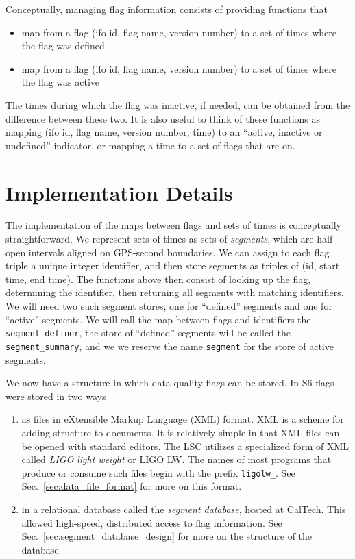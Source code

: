Conceptually, managing flag information consists of providing
functions that
%
\begin{itemize}
\item map from a flag (ifo id, flag name, version number) to a set of
times where the flag was defined
\item map from a flag (ifo id, flag name, version number) to a set of
times where the flag was active
\end{itemize}
%
The times
during which the flag was inactive, if needed, can be obtained from the
difference between these two.  It is also useful to think of these
functions as mapping (ifo id, flag name, version number, time) to an
``active, inactive or undefined'' indicator, or mapping a time to a
set of flags that are on.






\section{Implementation Details}

The implementation of the maps between flags and sets of times is
conceptually straightforward.  We represent sets of times as sets of
\emph{segments}, which are half-open intervals aligned on GPS-second
boundaries.  We can assign to each flag triple a unique integer
identifier, and then store segments as triples of (id, start time, end
time).  The functions above then consist of looking up the flag,
determining the identifier, then returning all segments with matching
identifiers.  We will need two such segment stores, one for
``defined'' segments and one for ``active'' segments.  We will call
the map between flags and identifiers the \texttt{segment\_definer},
the store of ``defined'' segments will be called the
\texttt{segment\_summary}, and we we reserve the name \texttt{segment}
for the store of active segments.

We now have a structure in which data quality flags can be stored.
In S6 flags were stored in two ways
%
\begin{enumerate}
\item as files in eXtensible Markup Language (XML) format.  XML is a
scheme for adding structure to documents.  It is relatively
simple in that XML files can be opened with standard editors.  The LSC
utilizes a specialized form of XML called \emph{LIGO light weight} or
LIGO LW.  The names of most programs that produce or consume such files
begin with the prefix \texttt{ligolw\_}.  See
Sec.~\ref{sec:data_file_format} for more on this format.

\item in a relational database called the \emph{segment database},
hosted at CalTech.  This allowed high-speed, distributed
access to flag information.  See
Sec.~\ref{sec:segment_database_design} for more on the structure of
the database.
\end{enumerate}


